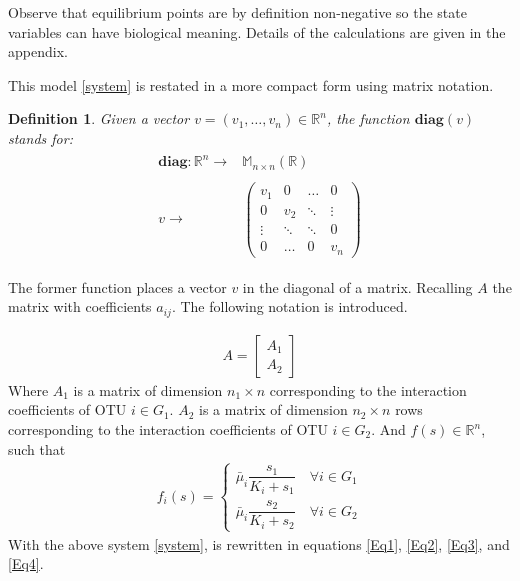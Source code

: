 \documentclass[3p,times]{elsarticle}
\newcommand{\R}{\mathbb{R}}
\newcommand{\diag}{\textbf{diag}}
\newtheorem{defn}{Definition}
\begin{document}
Observe that equilibrium points are by definition non-negative so the state variables can have biological meaning. Details of the calculations are given in the appendix. 

This model \eqref{system} is restated in a more compact form using matrix notation.

\begin{defn} Given a vector $v=(v_1,\dots, v_n)\in \R^n$, the function $\diag(v)$ stands for:
	\begin{align}
	\begin{array}{rc}
	\diag:\R^n \rightarrow & \mathbb{M}_{n\times n}(\R)\\
	& \\
	v \rightarrow & \begin{pmatrix}
	v_1 & 0 & \dots & 0 \\
	0 & v_2 & \ddots & \vdots\\ 
	\vdots & \ddots & \ddots& 0 \\
	0 & \dots &0 & v_n 
	\end{pmatrix}
	\end{array}
	\end{align}
\end{defn}

The former function places a vector $v$ in the diagonal of a matrix. Recalling $A$ the matrix with coefficients $a_{ij}$. The following notation is introduced.

\begin{align} A = \begin{bmatrix}
A_1\\A_2
\end{bmatrix}\end{align}
 Where $A_1$ is a matrix of dimension $n_1 \times n$ corresponding to the interaction coefficients of OTU $i \in G_1$. $A_2$ is a matrix of dimension $n_2 \times n$ rows corresponding to the interaction coefficients of OTU $i \in G_2$.
And  $f(s) \in \R^n$, such that 
\begin{align}
f_i(s) = \begin{cases}
\bar{\mu}_i \dfrac{s_1}{K_i + s_1} \quad \forall i \in G_1 \\
\bar{\mu}_i \dfrac{s_2}{K_i + s_2} \quad \forall i \in G_2
\end{cases}
\end{align}
With the above system \eqref{system}, is rewritten in equations \eqref{Eq1}, \eqref{Eq2}, \eqref{Eq3}, and \eqref{Eq4}.
\end{document}
